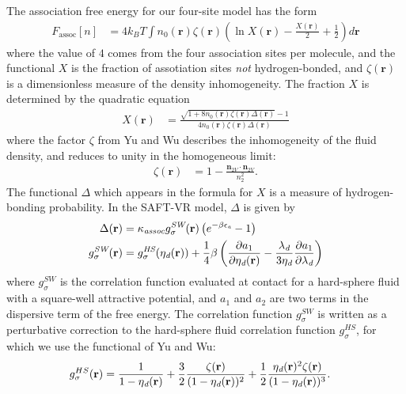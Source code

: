 \documentclass[letterpaper,twocolumn,amsmath,amssymb,prb]{revtex4-1}
\newcommand{\xx}{\textbf{r}}
\begin{document}
The association free energy for our four-site model has the form
\begin{align}
  F_\text{assoc}[n] &= 4 k_BT \int n_0(\xx)\zeta(\xx)
  \left(\ln X(\xx) - \frac{X(\xx)}{2} + \frac12\right) d\xx
\end{align}
where the value of $4$ comes from the four association sites per
molecule, and the functional $X$ is the fraction of assotiation sites
\emph{not} hydrogen-bonded, and $\zeta(\xx)$ is a dimensionless
measure of the density inhomogeneity.  The fraction $X$ is determined
by the quadratic equation
\begin{align}
  X(\xx) &= \frac{\sqrt{1 + 8n_0(\xx)\zeta(\xx)\Delta(\xx)} - 1}
  {4 n_0(\xx)\zeta(\xx)\Delta(\xx)}
\end{align}
where the factor $\zeta$ from
Yu and Wu\cite{yu2002fmt-dft-inhomogeneous-associating,
  fu2005vapor-liquid-dft} describes the inhomogeneity of the fluid
density, and reduces to unity in the homogeneous limit:
\begin{align}
  \zeta(\xx) &= 1 - \frac{\mathbf{n}_{2V}\cdot\mathbf{n}_{2V}}{n_2^2}.
\end{align}
The functional $\Delta$ which appears in the formula for $X$ is a
measure of hydrogen-bonding probability.  In the SAFT-VR
model\cite{gil-villegas-1997-SAFT-VR}, $\Delta$ is given by
\begin{align}
  \Delta(\xx) &= \kappa_\textit{assoc} g^\textit{SW}_\sigma(\xx)
  \left(e^{-\beta\epsilonassoc} - 1\right) \\
  g^\textit{SW}_\sigma(\xx) &= g^\textit{HS}_\sigma(\etadisp(\xx)) +
  \frac{1}{4}\beta\left(\frac{\partial a_1}{\partial \etadisp(\xx)} -
  \frac{\lambdadisp}{3 \etadisp}\frac{\partial a_1}{\partial \lambdadisp}\right)
\end{align}
where $g^\textit{SW}_\sigma$ is the correlation function evaluated at
contact for a hard-sphere fluid with a square-well attractive
potential, and $a_1$ and $a_2$ are two terms in the dispersive term of
the free energy.  The correlation function $g^\textit{SW}_\sigma$ is
written as a perturbative correction to the hard-sphere fluid correlation
function $g^\textit{HS}_\sigma$, for which we use the functional of Yu and
Wu\cite{yu2002fmt-dft-inhomogeneous-associating}:
\begin{align}
  g_\sigma^{HS}(\xx) &= \frac{1}{1-\etadisp(\xx)}
  +\frac32\frac{\zeta(\xx)}{(1-\etadisp(\xx))^2}
  + \frac12\frac{\etadisp(\xx)^2\zeta(\xx)}{(1-\etadisp(\xx))^3}.
\end{align}
\end{document}

